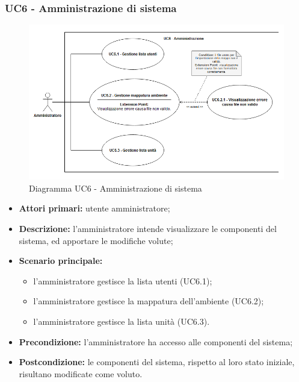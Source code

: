 \subsubsection{UC6 - Amministrazione di sistema}
	\begin{figure}[h!]
		\centering
		\includegraphics[width=17cm]{images/UC6.png}
		\caption{Diagramma UC6 - Amministrazione di sistema}
	\end{figure}
	\begin{itemize}
		\item \textbf{Attori primari:} utente amministratore;
		\item \textbf{Descrizione:} l'amministratore intende visualizzare le componenti del sistema, ed apportare le modifiche volute;
		\item \textbf{Scenario principale:} 
			\begin{itemize}
				\item l'amministratore gestisce la lista utenti (UC6.1);
				\item l'amministratore gestisce la mappatura dell'ambiente (UC6.2);
				\item l'amministratore gestisce la lista unità (UC6.3).
			\end{itemize}
		\item \textbf{Precondizione:} l'amministratore ha accesso alle componenti del sistema;
		\item \textbf{Postcondizione:} le componenti del sistema, rispetto al loro stato iniziale, risultano modificate come voluto.
	\end{itemize}
	
